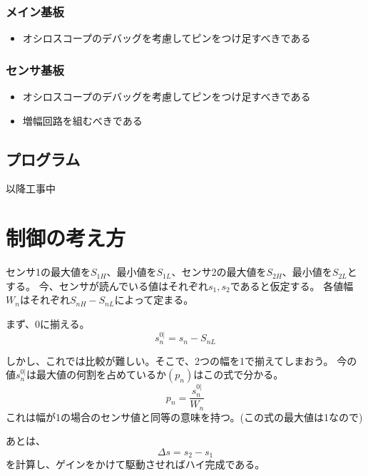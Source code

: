 \documentclass[a4paper]{ltjsarticle}
\begin{document}
\subsubsection{メイン基板}
\begin{itemize}
  \item オシロスコープのデバッグを考慮してピンをつけ足すべきである
\end{itemize}
\subsubsection{センサ基板}
\begin{itemize}
  \item オシロスコープのデバッグを考慮してピンをつけ足すべきである
  \item 増幅回路を組むべきである
\end{itemize}
\subsection{プログラム}
以降工事中

\section{制御の考え方}
センサ1の最大値を$S_{1H}$、最小値を$S_{1L}$、センサ2の最大値を$S_{2H}$、最小値を$S_{2L}$とする。
今、センサが読んでいる値はそれぞれ$s_{1},s_{2}$であると仮定する。
各値幅$W_{n}$はそれぞれ$S_{nH}-S_{nL}$によって定まる。

まず、0に揃える。
\begin{equation}
  s^{0|}_{n} = s_n-S_{nL}
\end{equation}

しかし、これでは比較が難しい。そこで、2つの幅を1で揃えてしまおう。
今の値$s^{0|}_{n}$は最大値の何割を占めているか$(p_n)$はこの式で分かる。
\begin{equation}
  p_n=\frac{s^{0|}_n}{W_n}
\end{equation}
これは幅が1の場合のセンサ値と同等の意味を持つ。(この式の最大値は1なので)

あとは、
\begin{equation}
  \Delta s = s_2-s_1
\end{equation}
を計算し、ゲインをかけて駆動させればハイ完成である。
\end{document}
